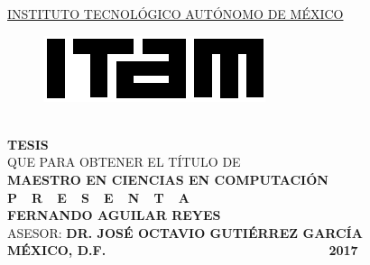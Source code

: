\begin{titlepage}
\begin{center}

\textsc{\underline{INSTITUTO TECNOLÓGICO AUTÓNOMO DE MÉXICO}}\\[1.5cm] %

\begin{figure}[h]
\centering
\includegraphics[scale=2]{imagenes/logoitam.png}\\[0.5cm] %
\end{figure} 

\huge{\thesisTitle}\\[1.5cm] %


\large \textbf{TESIS}\\ QUE PARA OBTENER EL TÍTULO DE\\ \textbf{MAESTRO EN CIENCIAS EN COMPUTACIÓN}\\[0.8cm]
\large \textbf{P\ \  R\ \  E\ \  S\ \  E\ \  N\ \  T\ \  A}\\[0.8cm]

\textbf{FERNANDO AGUILAR REYES}\\[1.0cm]

\large ASESOR: \textbf{DR. JOSÉ OCTAVIO GUTIÉRREZ GARCÍA}\\[1.4cm]

\large \textbf{MÉXICO, D.F.} {\ \ \ \ \ \ \ \ \ \ \ \ \ \ \ \ \ \ \ \ \ \ \ \ \ \ \ \ \ \ \ \ \ \ } \textbf{2017}

\vfill
\end{center}

\end{titlepage}
